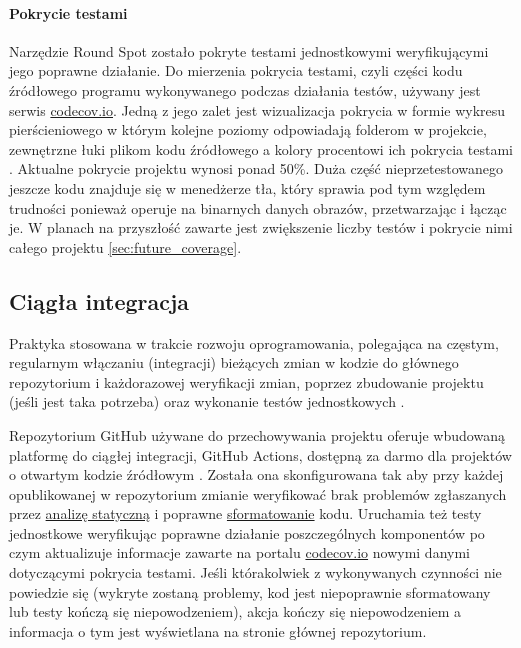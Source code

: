 \paragraph{Pokrycie testami}
\label{par:test_coverage}
Narzędzie Round Spot zostało pokryte testami jednostkowymi weryfikującymi jego poprawne działanie. Do mierzenia pokrycia testami, czyli części kodu źródłowego programu wykonywanego podczas działania testów, używany jest serwis \href{https://codecov.io/}{codecov.io}. Jedną z jego zalet jest wizualizacja pokrycia w formie wykresu pierścieniowego w którym kolejne poziomy odpowiadają folderom w projekcie, zewnętrzne łuki plikom kodu źródłowego a kolory procentowi ich pokrycia testami \cite{RS_Coverage}. Aktualne pokrycie projektu wynosi ponad 50\%. Duża część nieprzetestowanego jeszcze kodu znajduje się w menedżerze tła, który sprawia pod tym względem trudności ponieważ operuje na binarnych danych obrazów, przetwarzając i łącząc je. W planach na przyszłość zawarte jest zwiększenie liczby testów i  pokrycie nimi całego projektu \ref{sec:future_coverage}.

\bigskip
{}

\subsection{Ciągła integracja}
\label{sec:rs_ci}
Praktyka stosowana w trakcie rozwoju oprogramowania, polegająca na częstym, regularnym włączaniu (integracji) bieżących zmian w kodzie do głównego repozytorium i każdorazowej weryfikacji zmian, poprzez zbudowanie projektu (jeśli jest taka potrzeba) oraz wykonanie testów jednostkowych \cite{CI_definition}.

Repozytorium GitHub używane do przechowywania projektu oferuje wbudowaną platformę do ciągłej integracji, GitHub Actions, dostępną za darmo dla projektów o otwartym kodzie źródłowym \cite{RoundSpot_Actions}. Została ona skonfigurowana tak aby przy każdej opublikowanej w repozytorium zmianie weryfikować brak problemów zgłaszanych przez \hyperref[par:static_analysis]{analizę statyczną} i poprawne \hyperref[par:dart_format]{sformatowanie} kodu. Uruchamia też testy jednostkowe weryfikując poprawne działanie poszczególnych komponentów po czym aktualizuje informacje zawarte na portalu \href{https://codecov.io/}{codecov.io} \cite{RS_Coverage} nowymi danymi dotyczącymi pokrycia testami. Jeśli którakolwiek z wykonywanych czynności nie powiedzie się (wykryte zostaną problemy, kod jest niepoprawnie sformatowany lub testy kończą się niepowodzeniem), akcja kończy się niepowodzeniem a informacja o tym jest wyświetlana na stronie głównej repozytorium.
